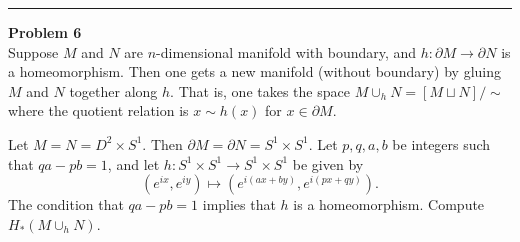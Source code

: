 \documentclass[a4paper, 12pt]{article}
\newenvironment{problem}[2][Problem]
    { \begin{mdframed}[backgroundcolor=gray!20] \textbf{#1 #2} \\}
    {  \end{mdframed}}
\begin{document}
\noindent\rule{7in}{2.8pt}
\begin{problem}{6}
Suppose \(M\) and \(N\) are \(n\)-dimensional manifold with boundary, and \(h:\partial M\rightarrow \partial N\) is a homeomorphism. Then one gets a new manifold (without boundary) by gluing \(M\) and \(N\) together along \(h\). That is, one takes the 
space \(M\cup_h N=[M\sqcup N]/\sim\) where the quotient relation is \(x\sim h(x)\) for \(x\in \partial M\). 

Let \(M=N=D^2\times S^1\). Then \(\partial M=\partial N=S^1\times S^1\). Let \(p,q,a,b\) be integers such that \(qa-pb=1\), and let \(h:S^1\times S^1\rightarrow S^1\times S^1\) be given by 
\[(e^{ix},e^{iy})\mapsto (e^{i(ax+by)},e^{i(px+qy)}).\]
The condition that \(qa-pb=1\) implies that \(h\) is a homeomorphism. Compute \(H_*(M\cup_h N)\).
\end{problem}
\end{document}
